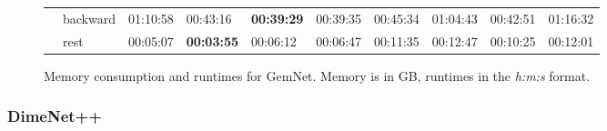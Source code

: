 \begin{figure}[H]
{\begin{tabular}{ll|l|l|l|l|l|l|l|l|}
    \multicolumn{1}{|l|}{}                          & backward    & 01:10:58 & 00:43:16          & \textbf{00:39:29} & 00:39:35       & 00:45:34 & 01:04:43       & 00:42:51          & 01:16:32    \\ \cline{2-10} 
    \multicolumn{1}{|l|}{}                          & rest        & 00:05:07 & \textbf{00:03:55} & 00:06:12          & 00:06:47       & 00:11:35 & 00:12:47       & 00:10:25          & 00:12:01    \\ \hline
    \end{tabular}}

    \captionsetup{width=\dimexpr\textwidth-1.5cm\relax}
    \caption{Memory consumption and runtimes for GemNet. 
    Memory is in GB, runtimes in the \textit{h:m:s} format.}
    \label{fig:gemnet-results}
    
\end{figure}

\newpage

\subsubsection{DimeNet++}

